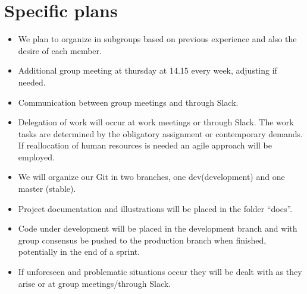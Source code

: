 \documentclass{article}
\begin{document}
\section*{Specific plans}
\begin{itemize}
\item We plan to organize in subgroups based on previous experience and also the desire of each member.
\item Additional group meeting at thursday at 14.15 every week, adjusting if needed.
\item Communication between group meetings and through Slack.
\item Delegation of work will occur at work meetings or through Slack. The work tasks are determined by the obligatory assignment or contemporary demands. If reallocation of human resources is needed an agile approach will be employed.
\item We will organize our Git in two branches, one dev(development) and one master (stable).
\item Project documentation and illustrations will be placed in the folder “docs”.
\item Code under development will be placed in the development branch and with group consensus be pushed to the production branch when finished, potentially in the end of a sprint.
\item If unforeseen and problematic situations occur they will be dealt with as they arise or at group meetings/through Slack. 
\end{itemize}
\end{document}
